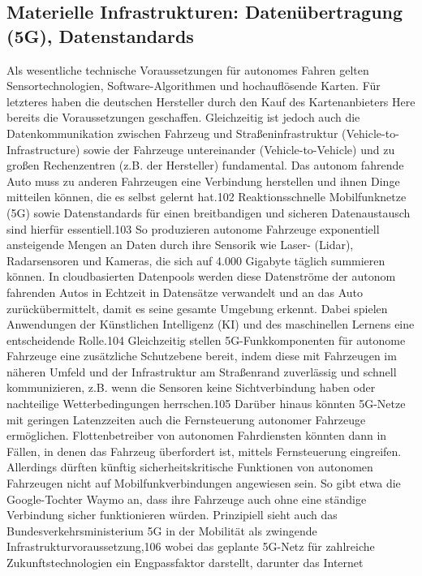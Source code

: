 \subsection{Materielle Infrastrukturen: Datenübertragung (5G), Datenstandards}
Als wesentliche technische Voraussetzungen für autonomes Fahren gelten Sensortechnologien, Software-Algorithmen und hochauflösende Karten. Für letzteres
haben die deutschen Hersteller durch den Kauf des Kartenanbieters Here bereits
die Voraussetzungen geschaffen. Gleichzeitig ist jedoch auch die Datenkommunikation zwischen Fahrzeug und Straßeninfrastruktur (Vehicle-to-Infrastructure) sowie der Fahrzeuge untereinander (Vehicle-to-Vehicle) und zu großen Rechenzentren (z.B. der Hersteller) fundamental. Das autonom fahrende Auto muss zu anderen
Fahrzeugen eine Verbindung herstellen und ihnen Dinge mitteilen können, die es
selbst gelernt hat.102 Reaktionsschnelle Mobilfunknetze (5G) sowie Datenstandards
für einen breitbandigen und sicheren Datenaustausch sind hierfür essentiell.103
So produzieren autonome Fahrzeuge exponentiell ansteigende Mengen an Daten
durch ihre Sensorik wie Laser- (Lidar), Radarsensoren und Kameras, die sich auf
4.000 Gigabyte täglich summieren können. In cloudbasierten Datenpools werden
diese Datenströme der autonom fahrenden Autos in Echtzeit in Datensätze verwandelt und an das Auto zurückübermittelt, damit es seine gesamte Umgebung
erkennt. Dabei spielen Anwendungen der Künstlichen Intelligenz (KI) und des
maschinellen Lernens eine entscheidende Rolle.104
Gleichzeitig stellen 5G-Funkkomponenten für autonome Fahrzeuge eine
zusätzliche Schutzebene bereit, indem diese mit Fahrzeugen im näheren Umfeld
und der Infrastruktur am Straßenrand zuverlässig und schnell kommunizieren,
z.B. wenn die Sensoren keine Sichtverbindung haben oder nachteilige Wetterbedingungen herrschen.105 Darüber hinaus könnten 5G-Netze mit geringen Latenzzeiten auch die Fernsteuerung autonomer Fahrzeuge ermöglichen. Flottenbetreiber
von autonomen Fahrdiensten könnten dann in Fällen, in denen das Fahrzeug überfordert ist, mittels Fernsteuerung eingreifen. Allerdings dürften künftig sicherheitskritische Funktionen von autonomen Fahrzeugen nicht auf Mobilfunkverbindungen angewiesen sein. So gibt etwa die Google-Tochter Waymo an, dass ihre
Fahrzeuge auch ohne eine ständige Verbindung sicher funktionieren würden.
Prinzipiell sieht auch das Bundesverkehrsministerium 5G in der Mobilität als
zwingende Infrastrukturvoraussetzung,106 wobei das geplante 5G-Netz für zahlreiche Zukunftstechnologien ein Engpassfaktor darstellt, darunter das Internet
